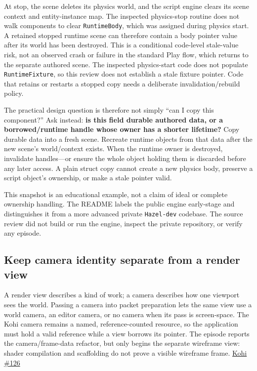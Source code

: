 At stop, the scene deletes its physics world, and the script engine clears its scene context and entity-instance map. The inspected physics-stop routine does not walk components to clear \texttt{RuntimeBody}, which was assigned during physics start. A retained stopped runtime scene can therefore contain a body pointer value after its world has been destroyed. This is a conditional code-level stale-value risk, not an observed crash or failure in the standard Play flow, which returns to the separate authored scene. The inspected physics-start code does not populate \texttt{RuntimeFixture}, so this review does not establish a stale fixture pointer. Code that retains or restarts a stopped copy needs a deliberate invalidation/rebuild policy.

The practical design question is therefore not simply ``can I copy this component?'' Ask instead: \textbf{is this field durable authored data, or a borrowed/runtime handle whose owner has a shorter lifetime?} Copy durable data into a fresh scene. Recreate runtime objects from that data after the new scene's world/context exists. When the runtime owner is destroyed, invalidate handles---or ensure the whole object holding them is discarded before any later access. A plain struct copy cannot create a new physics body, preserve a script object's ownership, or make a stale pointer valid.

This snapshot is an educational example, not a claim of ideal or complete ownership handling. The README labels the public engine early-stage and distinguishes it from a more advanced private \texttt{Hazel-dev} codebase. The source review did not build or run the engine, inspect the private repository, or verify any episode.

\subsection{Keep camera identity separate from a render view}\label{06-engine-ii-ch032-keep-camera-identity-separate-from-a-render-view}

\hypertarget{06-engine-ii-ch032-keep-camera-identity-separate-from-a-render-view}{}

A render view describes a kind of work; a camera describes how one viewport sees the world. Passing a camera into packet preparation lets the same view use a world camera, an editor camera, or no camera when its pass is screen-space. The Kohi camera remains a named, reference-counted resource, so the application must hold a valid reference while a view borrows its pointer. The episode reports the camera/frame-data refactor, but only begins the separate wireframe view: shader compilation and scaffolding do not prove a visible wireframe frame. \href{https://www.youtube.com/watch?v=xCA1MY94Hh0}{Kohi \#126}

